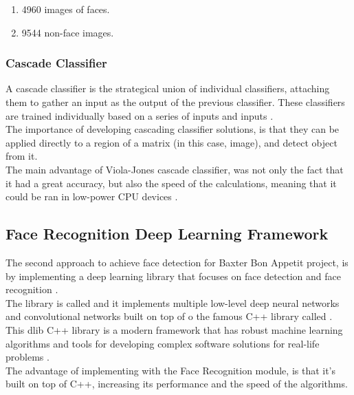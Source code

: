 \documentclass[11pt]{report} %
\begin{document}
\begin{enumerate}
    \item 4960 images of faces.
    \item 9544 non-face images.
\end{enumerate}


\subsubsection{Cascade Classifier}

A cascade classifier is the strategical union of individual classifiers, attaching them to gather an input as the output of the previous classifier.
These classifiers are trained individually based on a series of  inputs and  inputs \citep{cite_cascade_classifier_generalization}.\\

The importance of developing cascading classifier solutions, is that they can be applied directly to a region of a matrix (in this case, image), and detect object from it.\\

The main advantage of Viola-Jones cascade classifier, was not only the fact that it had a great accuracy, but also the speed of the calculations, meaning that it could be ran in low-power CPU devices \citep{cite_viola_jones_face_detection_algorithm}.\\



\subsection{Face Recognition Deep Learning Framework}

The second approach to achieve face detection for Baxter Bon Appetit project, is by implementing a deep learning library that focuses on face detection and face recognition \citep{cite_face_detect_face_recognition_github_repo}.\\

The library is called  and it implements multiple low-level deep neural networks and convolutional networks built on top of o the famous C++ library called . This dlib C++ library is a modern framework that has robust machine learning algorithms and tools for developing complex software solutions for real-life problems \citep{cite_dlib_github_repo}.\\

The advantage of implementing  with the Face Recognition module, is that it's built on top of C++, increasing its performance and the speed of the algorithms.\\
\end{document}
